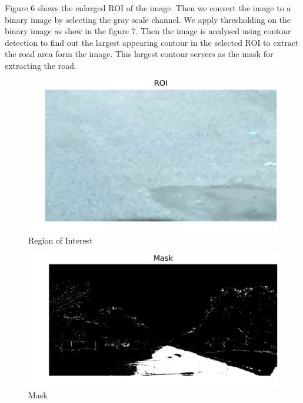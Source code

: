 \documentclass[journal]{IEEEtran}
\begin{document}
\noindent Figure 6 shows the enlarged ROI of the image. Then we convert the image to a binary image by selecting the gray scale channel. We apply thresholding on the binary image as show in the figure 7. Then the image is analysed using contour detection to find out the largest appearing contour in the selected ROI to extract the road area form the image. This largest contour servers as the mask for extracting the road. 

\begin{figure}[!htb]
\begin{center}
\includegraphics[scale=0.65]{Images/3_ROI.png}
\end{center}
\caption{Region of Interest}
\end{figure}

\begin{figure}[!htb]
\begin{center}
\includegraphics[scale=0.65]{Images/4_Mask.png}
\end{center}
\caption{Mask}
\end{figure}

\vspace{0.5cm}
\end{document}
